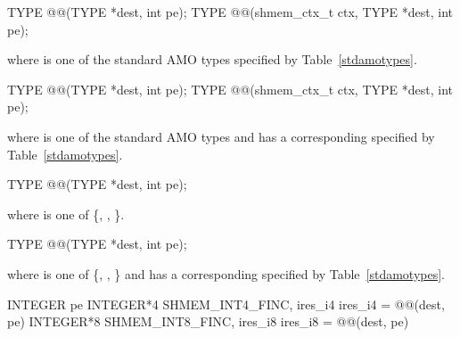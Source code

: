 
\begin{apidefinition}

\begin{C11synopsis}
TYPE @@(TYPE *dest, int pe);
TYPE @@(shmem_ctx_t ctx, TYPE *dest, int pe);
\end{C11synopsis}
where \TYPE{} is one of the standard \ac{AMO} types specified by
Table~\ref{stdamotypes}.

\begin{Csynopsis}
TYPE @@(TYPE *dest, int pe);
TYPE @@(shmem_ctx_t ctx, TYPE *dest, int pe);
\end{Csynopsis}
where \TYPE{} is one of the standard \ac{AMO} types and has a corresponding
\TYPENAME{} specified by Table~\ref{stdamotypes}.

\begin{DeprecateBlock}
\begin{C11synopsis}
TYPE @@(TYPE *dest, int pe);
\end{C11synopsis}
where \TYPE{} is one of \{, , \}.

\begin{Csynopsis}
TYPE @@(TYPE *dest, int pe);
\end{Csynopsis}
where \TYPE{} is one of \{, , \}
and has a corresponding \TYPENAME{} specified by Table~\ref{stdamotypes}.
\end{DeprecateBlock}

\begin{Fsynopsis}
INTEGER pe
INTEGER*4 SHMEM_INT4_FINC, ires_i4
ires\_i4 = @@(dest, pe)
INTEGER*8 SHMEM_INT8_FINC, ires_i8
ires\_i8 = @@(dest, pe)
\end{Fsynopsis}


\begin{apiarguments}



\end{apiarguments}
\end{apidefinition}
